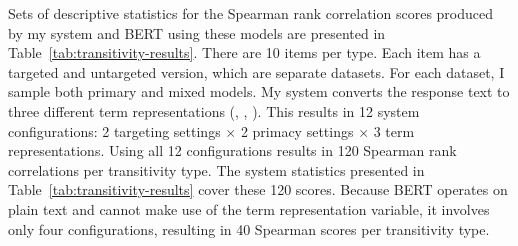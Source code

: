 Sets of descriptive statistics for the Spearman rank correlation scores produced by my system and BERT using these models are presented in Table~\ref{tab:transitivity-results}. There are 10 items per type. Each item has a targeted and untargeted version, which are separate datasets. For each dataset, I sample both primary and mixed models. My system converts the response text to three different term representations (, , ). This results in 12 system configurations: 2 targeting settings $\times$ 2 primacy settings $\times$ 3 term representations. Using all 12 configurations results in 120 Spearman rank correlations per transitivity type. The system statistics presented in Table~\ref{tab:transitivity-results} cover these 120 scores. Because BERT operates on plain text and cannot make use of the term representation variable, it involves only four configurations, resulting in 40 Spearman scores per transitivity type.

